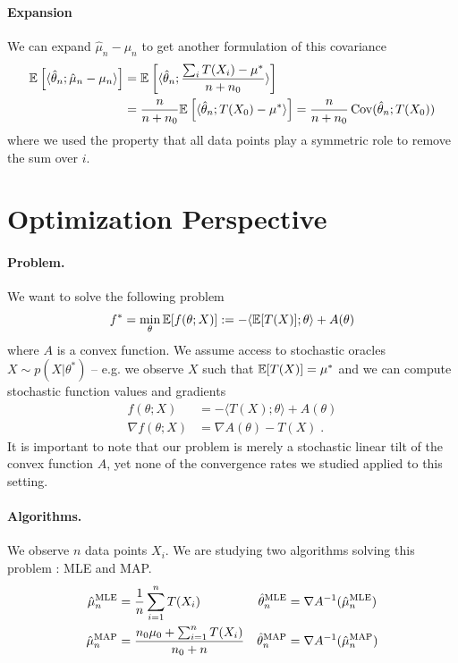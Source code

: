 \documentclass{article}
\newcommand*{\expect}[2][]{\ensuremath{\mathbb{E}_{#1} \left[ #2 \right] }} %
\newcommand{\logpart}{A}
\newcommand{\natp}{\theta}
\newcommand{\MAPm}{\hat \mu_n}
\newcommand{\MAPt}{\hat \natp_n}
\begin{document}
\paragraph{Expansion}
We can expand  $\hat \mu_n - \mu_n$ to get another formulation of this covariance
\begin{align}
	\expect{\langle \hat \natp_n ; \hat \mu_n - \mu_n \rangle}
	&= \expect{\langle \hat \natp_n ; \frac{\sum_i T(X_i) - \mu^*}{n+n_0} \rangle}  \\
	& = \frac{n}{n+n_0} \expect{\langle \hat \natp_n ; T(X_0) - \mu^*\rangle}
	= \frac{n}{n+n_0} \Cov(\hat \natp_n ; T(X_0) ) 
\end{align}
where we used the property that all data points play a symmetric role to remove the sum over $i$.

\clearpage

\section{Optimization Perspective}
\paragraph{Problem.}
We want  to solve the following problem
\begin{align}
	f^* = \min_\natp \E[f(\natp ; X)] := -\langle \E[T(X)] ; \natp \rangle + \logpart(\natp)
\end{align}
where $\logpart$ is a convex function.
We assume access to stochastic oracles $X \sim p(X | \natp^*)$ -- e.g. we observe $X$ such that $\operatorname{\mathbb{E}}[T(X)] = \mu^*$ and we can compute  stochastic function values and gradients 
\begin{align}
	f(\natp ; X) &= -\langle T(X) ; \natp \rangle + \logpart(\natp) \\
	\nabla f(\natp ; X) &= \nabla \logpart(\natp) - T(X)\; .
\end{align}
It is important to note that our problem is merely a stochastic linear tilt of the convex function $\logpart$, yet none of the convergence rates we studied applied to this setting.

\paragraph{Algorithms.}
We observe $n$ data points $X_i$. 
We are studying two algorithms solving this problem : MLE and MAP.
\begin{align}
	\MAPm^\text{MLE} &= \inv{n}\sum_{i=1}^n T(X_i) 
	&\MAPt^\text{MLE} &= \nabla\logpart^{-1}(\MAPm^\text{MLE}) \\
	\MAPm^\text{MAP} &= \frac{n_0\mu_0 + \smallsum_{i=1}^n T(X_i)}{n_0 + n}
	&\MAPt^\text{MAP} &= \nabla\logpart^{-1}(\MAPm^\text{MAP})	
\end{align}
\end{document}
